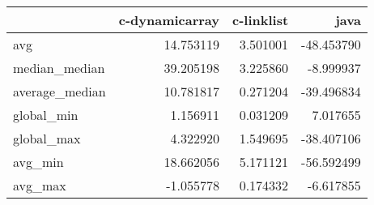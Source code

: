 \begin{tabular}{lrrr}
\toprule
{} &  c-dynamicarray &  c-linklist &       java \\
\midrule
avg            &       14.753119 &    3.501001 & -48.453790 \\
median\_median  &       39.205198 &    3.225860 &  -8.999937 \\
average\_median &       10.781817 &    0.271204 & -39.496834 \\
global\_min     &        1.156911 &    0.031209 &   7.017655 \\
global\_max     &        4.322920 &    1.549695 & -38.407106 \\
avg\_min        &       18.662056 &    5.171121 & -56.592499 \\
avg\_max        &       -1.055778 &    0.174332 &  -6.617855 \\
\bottomrule
\end{tabular}

